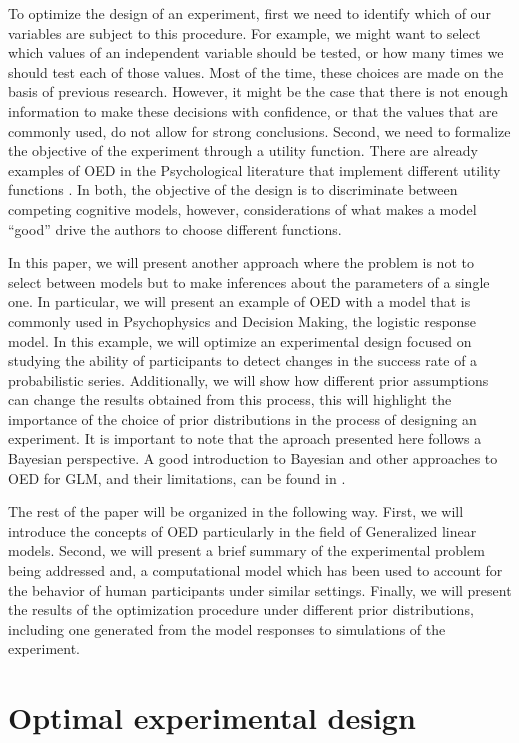 \documentclass[preprint,review,12pt]{elsarticle}
\begin{document}
To optimize the design of an experiment, first we need to identify which of our variables are subject to this procedure. For example, we might want to select which values of an independent variable should be tested, or how many times we should test each of those values. Most of the time, these choices are made on the basis of previous research. However, it might be the case that there is not enough information to make these decisions with confidence, or that the values that are commonly used, do not allow for strong conclusions. Second, we need to formalize the objective of the experiment through a utility function. There are already examples of OED in the Psychological literature that implement different utility functions \citep[e.g.][]{Myung2009,ZL2010}. In both, the objective of the design is to discriminate between competing cognitive models, however, considerations of what makes a model ``good'' drive the authors to choose different functions.

In this paper, we will present another approach where the problem is not to select between models but to make inferences about the parameters of a single one. In particular, we will present an example of OED with a model that is commonly used in Psychophysics and Decision Making, the logistic response model. %
In this example, we will optimize an experimental design focused on studying the ability of participants to detect changes in the success rate of a probabilistic series. Additionally, we will show how different prior assumptions can change the results obtained from this process, this will highlight the importance of the choice of prior distributions in the process of designing an experiment. It is important to note that the aproach presented here follows a Bayesian perspective. A good introduction to Bayesian and other approaches to OED for GLM, and their limitations, can be found in \citet{khurietal2006}.

The rest of the paper will be organized in the following way. First, we will introduce the concepts of OED particularly in the field of Generalized linear models. Second, we will present a brief summary of the experimental problem being addressed and, a computational model which has been used to account for the behavior of human participants under similar settings. Finally, we will present the results of the optimization procedure under different prior distributions, including one generated from the model responses to simulations of the experiment.

\section{Optimal experimental design}
\end{document}
